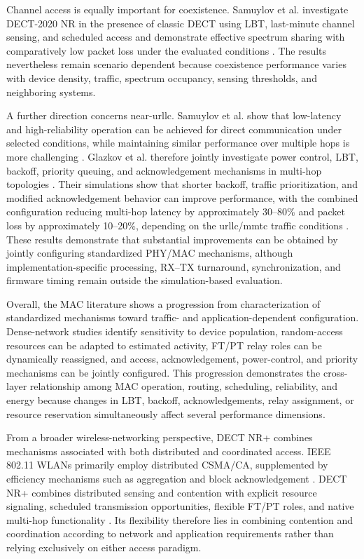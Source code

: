 Channel access is equally important for coexistence. Samuylov et al.
investigate DECT-2020 NR in the presence of classic DECT using LBT,
last-minute channel sensing, and scheduled access and demonstrate effective
spectrum sharing with comparatively low packet loss under the evaluated
conditions
\cite{samuylovPerformanceAssessmentDECT20202023}. The results nevertheless
remain scenario dependent because coexistence performance varies with device
density, traffic, spectrum occupancy, sensing thresholds, and neighboring
systems.

A further direction concerns near-\gls{urllc}. Samuylov et al. show that
low-latency and high-reliability operation can be achieved for direct
communication under selected conditions, while maintaining similar
performance over multiple hops is more challenging
\cite{samuylovEmpoweringNearURLLCIoT2025}. Glazkov et al. therefore jointly
investigate power control, LBT, backoff, priority queuing, and acknowledgement
mechanisms in multi-hop topologies
\cite{glazkovImprovingNearURLLCServices2025}. Their simulations show that
shorter backoff, traffic prioritization, and modified acknowledgement behavior
can improve performance, with the combined configuration reducing multi-hop
latency by approximately 30--80\% and packet loss by approximately 10--20\%,
depending on the \gls{urllc}/\gls{mmtc} traffic conditions
\cite{glazkovImprovingNearURLLCServices2025}. These results demonstrate that
substantial improvements can be obtained by jointly configuring standardized
PHY/MAC mechanisms, although implementation-specific processing, RX--TX
turnaround, synchronization, and firmware timing remain outside the
simulation-based evaluation.

Overall, the MAC literature shows a progression from characterization of
standardized mechanisms toward traffic- and application-dependent
configuration. Dense-network studies identify sensitivity to device
population, random-access resources can be adapted to estimated activity,
FT/PT relay roles can be dynamically reassigned, and access, acknowledgement,
power-control, and priority mechanisms can be jointly configured. This
progression demonstrates the cross-layer relationship among MAC operation,
routing, scheduling, reliability, and energy because changes in LBT, backoff,
acknowledgements, relay assignment, or resource reservation simultaneously
affect several performance dimensions.

From a broader wireless-networking perspective, DECT NR+ combines mechanisms
associated with both distributed and coordinated access. IEEE 802.11 WLANs
primarily employ distributed CSMA/CA, supplemented by efficiency mechanisms
such as aggregation and block acknowledgement
\cite{karmakarImpactIEEE80211n2017,wangIEEE80211nMAC2009}. DECT NR+ combines
distributed sensing and contention with explicit resource signaling,
scheduled transmission opportunities, flexible FT/PT roles, and native
multi-hop functionality
\cite{etsi_ts103636_1,etsi_ts103636_4}. Its flexibility therefore lies in
combining contention and coordination according to network and application
requirements rather than relying exclusively on either access paradigm.

